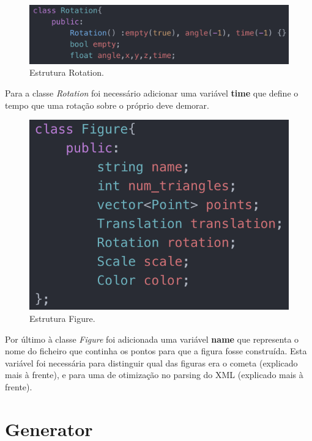 \documentclass[a4paper]{article}
\begin{document}
\begin{figure}[H]
\centering
\includegraphics[scale=0.65]{rotation.png}
\caption{Estrutura Rotation.}
\label{img:rotation}
\end{figure}

Para a classe \textit{Rotation} foi necessário adicionar uma variável \textbf{time} que define o tempo que uma rotação sobre o próprio deve demorar.

\begin{figure}[H]
\centering
\includegraphics[scale=0.75]{figure.png}
\caption{Estrutura Figure.}
\label{img:figure}
\end{figure}

Por último à classe \textit{Figure} foi adicionada uma variável \textbf{name} que representa o nome do ficheiro que continha os pontos para que a figura fosse construída. Esta variável foi necessária para distinguir qual das figuras era o cometa (explicado mais à frente), e para uma de otimização no parsing do XML (explicado mais à frente).


\newpage

\section{Generator}
\label{sec:generator}
\end{document}
